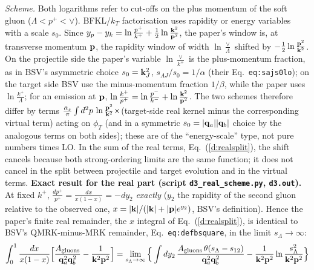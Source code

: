 \emph{Scheme.} Both logarithms refer to cut-offs on the plus momentum of the soft gluon ($\Lambda<p^+<\vee$). BFKL/$k_T$ factorisation uses rapidity or energy variables with a scale $s_0$. Since $y_p-y_k=\ln\frac{p^+}{k^+}+\frac12\ln\frac{\mathbf{k}^2}{\mathbf{p}^2}$, the paper's window is, at transverse momentum $\mathbf{p}$, the rapidity window of width $\ln\frac{\vee}{\Lambda}$ shifted by $-\frac12\ln\frac{\mathbf{p}^2}{\mathbf{k}^2}$. On the projectile side the paper's variable $\ln\frac{\vee}{k^+}$ is the plus-momentum fraction, as in BSV's asymmetric choice $s_0=\mathbf{k}_J^2$, $s_{AJ}/s_0=1/\alpha$ (their Eq.~\texttt{eq:sajs0lo}); on the target side BSV use the minus-momentum fraction $1/\beta$, while the paper uses $\ln\frac{k^+}{\Lambda}$; for an emission at $\mathbf{p}$, $\ln\frac{k^+}{p^+}=\ln\frac{p^-}{k^-}+\ln\frac{\mathbf{k}^2}{\mathbf{p}^2}$. The two schemes therefore differ by terms $\frac{\bar\alpha_s}{\pi}\int d^2p\,\ln\frac{\mathbf{p}^2}{\mathbf{k}^2}\times$(target-side real kernel minus the corresponding virtual term) acting on $\phi_T$ (and in a symmetric $s_0=|\mathbf{q}_a||\mathbf{q}_b|$ choice by the analogous terms on both sides); these are of the ``energy-scale'' type, not pure numbers times LO. In the sum of the real terms, Eq.~(\ref{d:realsplit}), the shift cancels because both strong-ordering limits are the same function; it does not cancel in the split between projectile and target evolution and in the virtual terms. \textbf{Exact result for the real part (script \texttt{d3\_real\_scheme.py}, \texttt{d3.out}).} At fixed $k^+$, $\frac{dp^+}{p^+}=\frac{dx}{x(1-x)}=-dy_2$ \emph{exactly} ($y_2$ the rapidity of the second gluon relative to the observed one, $x=|\mathbf{k}|/(|\mathbf{k}|+|\mathbf{p}|e^{y_2})$, BSV's definition). Hence the paper's finite real remainder, the $x$ integral of Eq.~(\ref{d:realsplit}), is identical to BSV's QMRK-minus-MRK remainder, Eq.~\texttt{eq:defbsquare}, in the limit $s_\Lambda\to\infty$:
\begin{align}
\int_0^1\frac{dx}{x(1-x)}\Big[\frac{A_{\rm gluons}}{\mathbf{q}_a^2\mathbf{q}_b^2}-\frac{1}{\mathbf{k}^2\mathbf{p}^2}\Big]=\lim_{s_\Lambda\to\infty}\Big\{\int dy_2\,\frac{A_{\rm gluons}\,\theta(s_\Lambda-s_{12})}{\mathbf{q}_a^2\mathbf{q}_b^2}-\frac{1}{\mathbf{k}^2\mathbf{p}^2}\ln\frac{s_\Lambda^2}{\mathbf{k}^2\mathbf{p}^2}\Big\}\label{d:schemeid}
\end{align}
